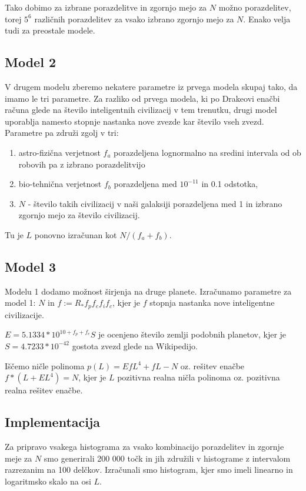 \documentclass[a4paper]{IEEEtran}
\begin{document}
Tako dobimo za izbrane porazdelitve in zgornjo mejo za $N$ možno porazdelitev, torej $5^6$ različnih porazdelitev za vsako izbrano zgornjo mejo za $N$. Enako velja tudi za preostale modele.

\subsection{Model 2}

V drugem modelu zberemo nekatere parametre iz prvega modela skupaj tako, da imamo le tri parametre. Za razliko od prvega modela, ki po Drakeovi enačbi računa glede na število inteligentnih civilizacij v tem trenutku, drugi model uporablja namesto stopnje nastanka nove zvezde kar število vseh zvezd. Parametre pa združi zgolj v tri:
\begin{enumerate}
	\item astro-fizična verjetnost $f_a$ porazdeljena lognormalno na sredini intervala od  ob robovih pa z izbrano porazdelitvijo
	\item bio-tehnična verjetnost $f_b$ porazdeljena med $10^{-11}$ in 0.1 odstotka,
	\item $N$ - število takih civilizacij v naši galaksiji porazdeljena med 1 in izbrano zgornjo mejo za število civilizacij.
\end{enumerate}

Tu je $L$ ponovno izračunan kot $N / (f_a + f_b)$.

\subsection{Model 3}

Modelu 1 dodamo možnost širjenja na druge planete. Izračunamo parametre za model 1:
$N$ in $f := R_\ast f_p f_e f_i f_c$, kjer je $f$ stopnja nastanka nove inteligentne civilizacije.

$E = 5.1334 * 10^{10 + f_p + f_e} S$ je ocenjeno število zemlji podobnih planetov, kjer je $S = 4.7233 * 10^{-42}$ gostota zvezd glede na Wikipedijo.

Iščemo ničle polinoma $p(L) = E f L^4 + f L - N$ oz. rešitev enačbe $f * (L + E L^4) = N$, kjer je $L$ pozitivna realna ničla polinoma oz. pozitivna realna rešitev enačbe.

\subsection{Implementacija}

Za pripravo vsakega histograma za vsako kombinacijo porazdelitev in zgornje meje za $N$ smo generirali 200 000 točk in jih združili v histograme z intervalom razrezanim na 100 delčkov. Izračunali smo histogram, kjer smo imeli linearno in logaritmsko skalo na osi $L$.
\end{document}
